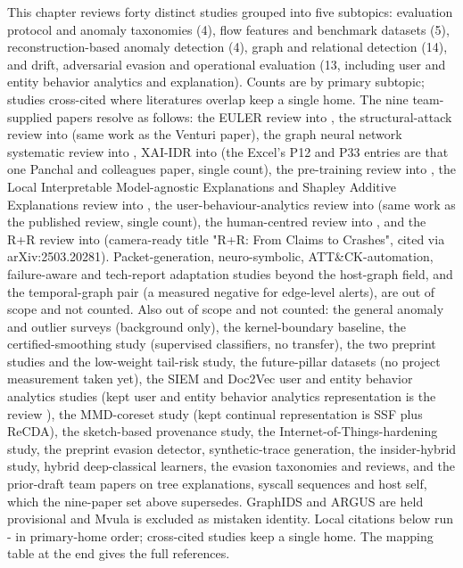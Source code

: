 This chapter reviews forty distinct studies grouped into five subtopics: evaluation protocol and anomaly taxonomies (4), flow features and benchmark datasets (5), reconstruction-based anomaly detection (4), graph and relational detection (14), and drift, adversarial evasion and operational evaluation (13, including user and entity behavior analytics and explanation). Counts are by primary subtopic; studies cross-cited where literatures overlap keep a single home. The nine team-supplied papers resolve as follows: the EULER review into \cite{k17}, the structural-attack review into \cite{k25} (same work as the Venturi paper), the graph neural network systematic review into \cite{k24}, XAI-IDR into \cite{k40} (the Excel's P12 and P33 entries are that one Panchal and colleagues paper, single count), the pre-training review into \cite{k20}, the Local Interpretable Model-agnostic Explanations and Shapley Additive Explanations review into \cite{k36}, the user-behaviour-analytics review into \cite{k39} (same work as the published review, single count), the human-centred review into \cite{k38}, and the R+R review into \cite{k23} (camera-ready title "R+R: From Claims to Crashes", cited via arXiv:2503.20281). Packet-generation, neuro-symbolic, ATT\&CK-automation, failure-aware and tech-report adaptation studies beyond the host-graph field, and the temporal-graph pair (a measured negative for edge-level alerts), are out of scope and not counted. Also out of scope and not counted: the general anomaly and outlier surveys (background only), the kernel-boundary baseline, the certified-smoothing study (supervised classifiers, no transfer), the two preprint studies and the low-weight tail-risk study, the future-pillar datasets (no project measurement taken yet), the SIEM and Doc2Vec user and entity behavior analytics studies (kept user and entity behavior analytics representation is the review \cite{k39}), the MMD-coreset study (kept continual representation is SSF plus ReCDA), the sketch-based provenance study, the Internet-of-Things-hardening study, the preprint evasion detector, synthetic-trace generation, the insider-hybrid study, hybrid deep-classical learners, the evasion taxonomies and reviews, and the prior-draft team papers on tree explanations, syscall sequences and host self, which the nine-paper set above supersedes. GraphIDS and ARGUS are held provisional and Mvula is excluded as mistaken identity. Local citations below run \cite{k1}-\cite{k40} in primary-home order; cross-cited studies keep a single home. The mapping table at the end gives the full references.

